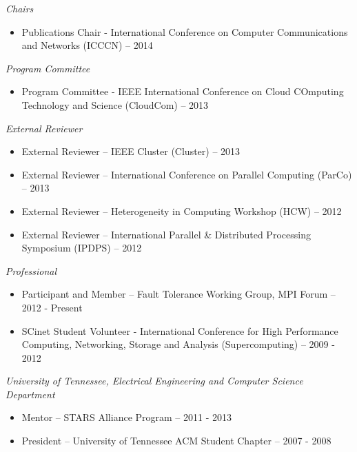 {\sl Chairs}
\begin{itemize}
    \item Publications Chair - International Conference on Computer
        Communications and Networks (ICCCN) -- 2014
\end{itemize}

{\sl Program Committee}
\begin{itemize}
    \item Program Committee - IEEE International Conference on Cloud COmputing
        Technology and Science (CloudCom) -- 2013
\end{itemize}

{\sl External Reviewer}
\begin{itemize}
    \item External Reviewer -- IEEE Cluster (Cluster) -- 2013
    \item External Reviewer -- International Conference on Parallel Computing (ParCo) -- 2013
    \item External Reviewer -- Heterogeneity in Computing Workshop (HCW) -- 2012
    \item External Reviewer -- International Parallel \& Distributed Processing
        Symposium (IPDPS) -- 2012
\end{itemize}

{\sl Professional}
\begin{itemize}
    \item Participant and Member -- Fault Tolerance Working Group, MPI Forum -- 2012 - Present
    \item SCinet Student Volunteer - International Conference for High
        Performance Computing, Networking, Storage and Analysis
        (Supercomputing) -- 2009 - 2012
\end{itemize}

{\sl University of Tennessee, Electrical Engineering and Computer Science Department}
\begin{itemize}
    \item Mentor -- STARS Alliance Program -- 2011 - 2013
    \item President -- University of Tennessee ACM Student Chapter -- 2007 - 2008
\end{itemize}
